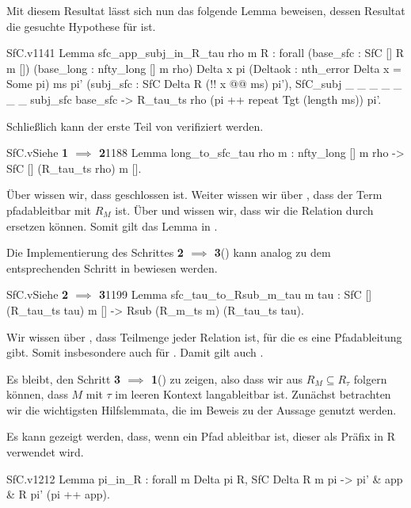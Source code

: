 Mit diesem Resultat lässt sich nun das folgende Lemma beweisen, dessen Resultat die gesuchte Hypothese für  ist.

\begin{code}{SfC.v}{}{1141}
Lemma sfc_app_subj_in_R_tau {rho m R} :
  forall (base_sfc : SfC [] R m []) (base_long : nfty_long [] m rho) 
    Delta x pi (Deltaok : nth_error Delta x = Some pi) ms pi'
      (subj_sfc : SfC Delta R (!! x @@ ms) pi'),
   SfC_subj _ _ _ _ _ _ _ subj_sfc base_sfc ->
        R_tau_ts rho (pi ++ repeat Tgt (length ms)) pi'.
\end{code}

Schließlich kann der erste Teil von  verifiziert werden.

\begin{code}{SfC.v}{Siehe  \textbf{1 $\implies$ 2}}{1188}
Lemma long_to_sfc_tau {rho m} : nfty_long [] m rho ->
    SfC [] (R_tau_ts rho) m [].
\end{code}
Über  wissen wir, dass  geschlossen ist. Weiter wissen wir über , dass der Term pfadableitbar mit $R_M$ ist. Über  und  wissen wir, dass wir die Relation durch  ersetzen können. Somit gilt das Lemma in .

Die Implementierung des Schrittes \textbf{2 $\implies$ 3}() kann analog zu dem entsprechenden Schritt in  bewiesen werden.

\begin{code}{SfC.v}{Siehe  \textbf{2 $\implies$ 3}}{1199}
Lemma sfc_tau_to_Rsub_m_tau {m tau} : 
    SfC [] (R_tau_ts tau) m [] -> Rsub (R_m_ts m) (R_tau_ts tau).
\end{code}

Wir wissen über , dass  Teilmenge jeder Relation ist, für die es eine Pfadableitung gibt. Somit insbesondere auch für . Damit gilt auch .

Es bleibt, den Schritt \textbf{3 $\implies$ 1}() zu zeigen, also dass wir aus $R_M\subseteq R_\tau$ folgern können, dass $M$ mit $\tau$ im leeren Kontext langableitbar ist. Zunächst betrachten wir die wichtigsten Hilfslemmata, die im Beweis zu der Aussage genutzt werden.

Es kann gezeigt werden, dass, wenn ein Pfad ableitbar ist, dieser als Präfix in R verwendet wird.
\begin{code}[pi_in_R]{SfC.v}{}{1212}
Lemma pi_in_R : forall m Delta pi R, 
    SfC Delta R m pi -> {pi' & {app & R pi' (pi ++ app)}}.
\end{code}

